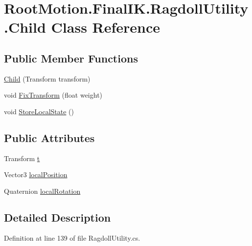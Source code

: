 \hypertarget{class_root_motion_1_1_final_i_k_1_1_ragdoll_utility_1_1_child}{}\section{Root\+Motion.\+Final\+I\+K.\+Ragdoll\+Utility.\+Child Class Reference}
\label{class_root_motion_1_1_final_i_k_1_1_ragdoll_utility_1_1_child}
\subsection*{Public Member Functions}
\begin{DoxyCompactItemize}
\item 
\mbox{\hyperlink{class_root_motion_1_1_final_i_k_1_1_ragdoll_utility_1_1_child_ab7f369e3f50b96e91427257a65a5436d}{Child}} (Transform transform)
\item 
void \mbox{\hyperlink{class_root_motion_1_1_final_i_k_1_1_ragdoll_utility_1_1_child_a72abd226d5859fc812e369ce3343a54b}{Fix\+Transform}} (float weight)
\item 
void \mbox{\hyperlink{class_root_motion_1_1_final_i_k_1_1_ragdoll_utility_1_1_child_ac01d3be9fcdd375aabc972469882f912}{Store\+Local\+State}} ()
\end{DoxyCompactItemize}
\subsection*{Public Attributes}
\begin{DoxyCompactItemize}
\item 
Transform \mbox{\hyperlink{class_root_motion_1_1_final_i_k_1_1_ragdoll_utility_1_1_child_a1160d4c2e41d7fb8a6a771448df1f1dc}{t}}
\item 
Vector3 \mbox{\hyperlink{class_root_motion_1_1_final_i_k_1_1_ragdoll_utility_1_1_child_a8f0376fc0cb81d1484d8d65f90af5b0e}{local\+Position}}
\item 
Quaternion \mbox{\hyperlink{class_root_motion_1_1_final_i_k_1_1_ragdoll_utility_1_1_child_ade83debc8049a04a5e359c6a6bdb9b34}{local\+Rotation}}
\end{DoxyCompactItemize}


\subsection{Detailed Description}


Definition at line 139 of file Ragdoll\+Utility.\+cs.



